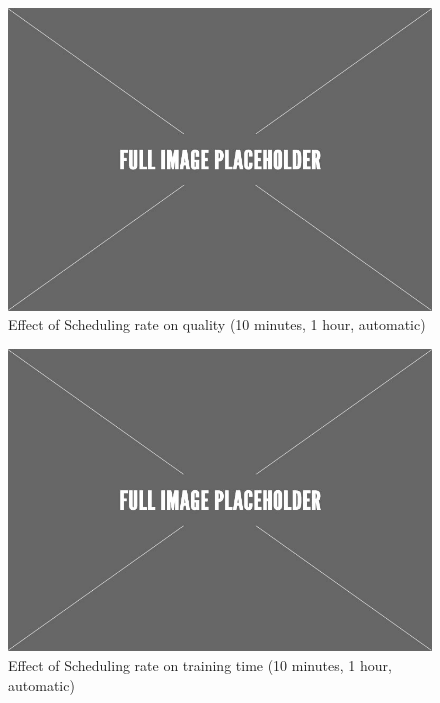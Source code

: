 \begin{figure}[h!]
\centering
\includegraphics[width=\columnwidth]{../images/placeholder.jpeg}
\caption{Effect of Scheduling rate on quality (10 minutes, 1 hour, automatic)}
\label{fig:scheduling-policy-quality}
\vspace{2mm}
\end{figure}

\begin{figure}[h!]
\centering
\includegraphics[width=\columnwidth]{../images/placeholder.jpeg}
\caption{Effect of Scheduling rate on training time (10 minutes, 1 hour, automatic)}
\label{fig:scheduling-policy-time}
\vspace{2mm}
\end{figure}


